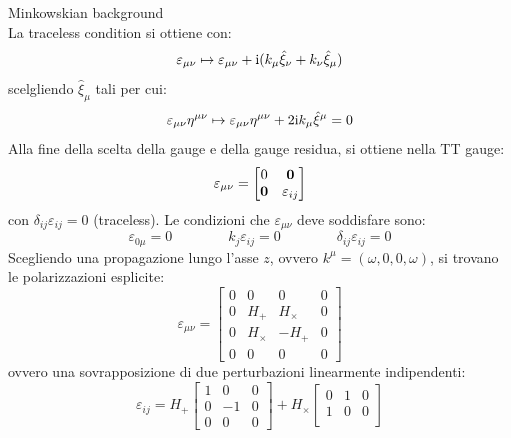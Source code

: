 \begin{example}{Minkowskian background}{}
\begin{equation*}
  \end{equation*}
  La traceless condition si ottiene con:
  \begin{equation}
    \varepsilon_{\mu \nu} \mapsto \varepsilon_{\mu \nu} + \mathrm{i} (k_\mu \hat{\xi}_\nu + k_\nu \hat{\xi}_\mu)
  \end{equation}
  scelgliendo $ \hat{\xi}_\mu $ tali per cui:
  \begin{equation*}
    \varepsilon_{\mu \nu} \eta^{\mu \nu} \mapsto \varepsilon_{\mu \nu} \eta^{\mu \nu} + 2 \mathrm{i} k_\mu \hat{\xi}^\mu = 0
  \end{equation*}
  Alla fine della scelta della gauge e della gauge residua, si ottiene nella TT gauge:
  \begin{equation*}
    \varepsilon_{\mu \nu} =
    \begin{bmatrix}
      0 & \mathbf{0} \\
      \mathbf{0} & \varepsilon_{ij}
    \end{bmatrix}
  \end{equation*}
  con $ \delta_{ij} \varepsilon_{ij} = 0 $ (traceless). Le condizioni che $ \varepsilon_{\mu \nu} $ deve soddisfare sono:
  \begin{equation}
    \varepsilon_{0\mu} = 0
    \qquad \qquad
    k_j \varepsilon_{ij} = 0
    \qquad \qquad
    \delta_{ij} \varepsilon_{ij} = 0
  \end{equation}
  Scegliendo una propagazione lungo l'asse $ z $, ovvero $ k^\mu = (\omega , 0 , 0 , \omega) $, si trovano le polarizzazioni esplicite:
  \begin{equation}
    \varepsilon_{\mu \nu} =
    \begin{bmatrix}
      0 & 0 & 0 & 0 \\
      0 & H_+ & H_\times & 0 \\
      0 & H_\times & - H_+ & 0 \\
      0 & 0 & 0 & 0
    \end{bmatrix}
  \end{equation}
  ovvero una sovrapposizione di due perturbazioni linearmente indipendenti:
  \begin{equation*}
    \varepsilon_{ij} = H_+
    \begin{bmatrix}
      1 & 0 & 0 \\
      0 & -1 & 0 \\
      0 & 0 & 0
    \end{bmatrix}
    + H_\times
    \begin{bmatrix}
      0 & 1 & 0 \\
      1 & 0 & 0 \\

\end{bmatrix}
\end{equation*}
\end{example}

